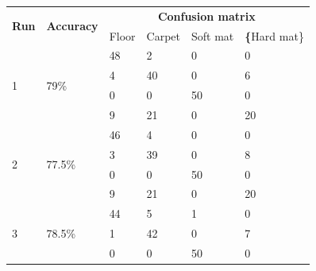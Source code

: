 \documentclass[USenglish]{ifimaster}  %
\begin{document}
\begin{table}[h]
	\centering
	\begin{tabular}{@{}llllll@{}}
		\toprule
		\multirow{2}{*}{\textbf{Run}} & \multirow{2}{*}{\textbf{Accuracy}} & \multicolumn{4}{c}{\textbf{Confusion matrix}} \\ \cmidrule(l){3-6} 
		&  & \multicolumn{1}{l|}{Floor} & \multicolumn{1}{l|}{Carpet} & \multicolumn{1}{l|}{Soft mat} & \textbf\{Hard mat\} \\ \midrule
		\multicolumn{1}{l|}{\multirow{4}{*}{1}} & \multicolumn{1}{l|}{\multirow{4}{*}{79\%}} & \multicolumn{1}{l|}{48} & \multicolumn{1}{l|}{2} & \multicolumn{1}{l|}{0} & 0 \\ \cmidrule(l){3-6} 
		\multicolumn{1}{l|}{} & \multicolumn{1}{l|}{} & \multicolumn{1}{l|}{4} & \multicolumn{1}{l|}{40} & \multicolumn{1}{l|}{0} & 6 \\ \cmidrule(l){3-6} 
		\multicolumn{1}{l|}{} & \multicolumn{1}{l|}{} & \multicolumn{1}{l|}{0} & \multicolumn{1}{l|}{0} & \multicolumn{1}{l|}{50} & 0 \\ \cmidrule(l){3-6} 
		\multicolumn{1}{l|}{} & \multicolumn{1}{l|}{} & \multicolumn{1}{l|}{9} & \multicolumn{1}{l|}{21} & \multicolumn{1}{l|}{0} & 20 \\ \midrule
		\multicolumn{1}{l|}{\multirow{4}{*}{2}} & \multicolumn{1}{l|}{\multirow{4}{*}{77.5\%}} & \multicolumn{1}{l|}{46} & \multicolumn{1}{l|}{4} & \multicolumn{1}{l|}{0} & 0 \\ \cmidrule(l){3-6} 
		\multicolumn{1}{l|}{} & \multicolumn{1}{l|}{} & \multicolumn{1}{l|}{3} & \multicolumn{1}{l|}{39} & \multicolumn{1}{l|}{0} & 8 \\ \cmidrule(l){3-6} 
		\multicolumn{1}{l|}{} & \multicolumn{1}{l|}{} & \multicolumn{1}{l|}{0} & \multicolumn{1}{l|}{0} & \multicolumn{1}{l|}{50} & 0 \\ \cmidrule(l){3-6} 
		\multicolumn{1}{l|}{} & \multicolumn{1}{l|}{} & \multicolumn{1}{l|}{9} & \multicolumn{1}{l|}{21} & \multicolumn{1}{l|}{0} & 20 \\ \midrule
		\multicolumn{1}{l|}{\multirow{4}{*}{3}} & \multicolumn{1}{l|}{\multirow{4}{*}{78.5\%}} & \multicolumn{1}{l|}{44} & \multicolumn{1}{l|}{5} & \multicolumn{1}{l|}{1} & 0 \\ \cmidrule(l){3-6} 
		\multicolumn{1}{l|}{} & \multicolumn{1}{l|}{} & \multicolumn{1}{l|}{1} & \multicolumn{1}{l|}{42} & \multicolumn{1}{l|}{0} & 7 \\ \cmidrule(l){3-6} 
		\multicolumn{1}{l|}{} & \multicolumn{1}{l|}{} & \multicolumn{1}{l|}{0} & \multicolumn{1}{l|}{0} & \multicolumn{1}{l|}{50} & 0 \\ \cmidrule(l){3-6} 

\end{tabular}
\end{table}
\end{document}
